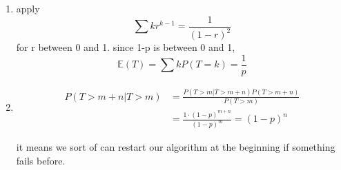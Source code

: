 \documentclass{article}
\begin{document}
\begin{enumerate}
\begin{enumerate}
        \item apply \begin{equation}
            \sum kr^{k-1} = \frac{1}{(1-r)^2}
        \end{equation} for r between 0 and 1. since 1-p is between 0 and 1,\begin{equation}
            \mathbb E(T) = \sum kP(T=k) = \frac{1}{p}
        \end{equation}
        \item 
        \begin{equation}
            \begin{split}
                P(T>m+n|T>m) &= \frac{P(T>m|T>m+n)P(T>m+n)}{P(T>m)} \\
                &= \frac{1\cdot(1-p)^{m+n}}{(1-p)^m} = (1-p)^n
            \end{split}
        \end{equation}

        it means we sort of can restart our algorithm at the beginning if something fails before. 


\end{enumerate}
\end{enumerate}
\end{document}
